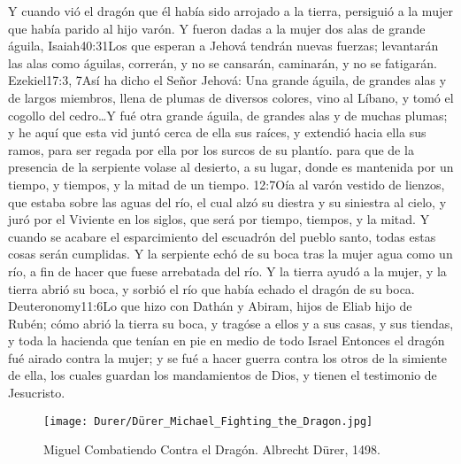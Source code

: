 Y cuando vió el dragón que él había sido arrojado a la tierra, persiguió a la mujer que había parido al hijo varón.
Y fueron dadas a la mujer dos alas de grande águila,%
				   {Isaiah}{40:31}{Los que esperan a Jehová tendrán nuevas fuerzas; levantarán las alas como águilas, correrán, y no se cansarán, caminarán, y no se fatigarán.}%
				   {Ezekiel}{17:3, 7}{Así ha dicho el Señor Jehová: Una grande águila, de grandes alas y de largos miembros, llena de plumas de diversos colores, vino al Líbano, y tomó el cogollo del cedro\ldots Y fué otra grande águila, de grandes alas y de muchas plumas; y he aquí que esta vid juntó cerca de ella sus raíces, y extendió hacia ella sus ramos, para ser regada por ella por los surcos de su plantío.}
 para que de la presencia de la serpiente volase al desierto, a su lugar, donde es mantenida por un tiempo, y tiempos, y la mitad de un tiempo.%
				    {12:7}{Oía al varón vestido de lienzos, que estaba sobre las aguas del río, el cual alzó su diestra y su siniestra al cielo, y juró por el Viviente en los siglos, que será por tiempo, tiempos, y la mitad. Y cuando se acabare el esparcimiento del escuadrón del pueblo santo, todas estas cosas serán cumplidas.}
Y la serpiente echó de su boca tras la mujer agua como un río, a fin de hacer que fuese arrebatada del río. 
Y la tierra ayudó a la mujer, y la tierra abrió su boca, y sorbió el río que había echado el dragón de su boca.%
				  {Deuteronomy}{11:6}{Lo que hizo con Dathán y Abiram, hijos de Eliab hijo de Rubén; cómo abrió la tierra su boca, y tragóse a ellos y a sus casas, y sus tiendas, y toda la hacienda que tenían en pie en medio de todo Israel}
Entonces el dragón fué airado contra la mujer; y se fué a hacer guerra contra los otros de la simiente de ella, los cuales guardan los mandamientos de Dios, y tienen el testimonio de Jesucristo.%

\begin{figure*}[p]
  	\centering
  	\texttt{[image: Durer/Dürer\_Michael\_Fighting\_the\_Dragon.jpg]}
  	\caption[Miguel Combatiendo Contra el Dragón]{Miguel Combatiendo Contra el Dragón. Albrecht Dürer, 1498.}
  \end{figure*}

